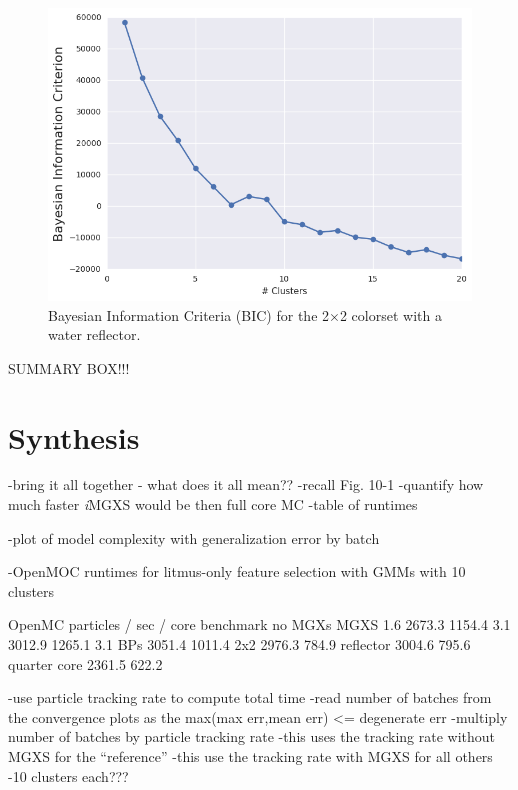 \begin{figure}[h!]
\centering
\includegraphics[width=0.87\linewidth]{figures/results/model-select/reflector/bic-combined-U238-nu-fission-1}
\vspace{2mm}
\caption[BIC for the 2$\times$2 colorset with reflector]{Bayesian Information Criteria (BIC) for the 2$\times$2 colorset with a water reflector.}
\label{fig:chap11-refl-bic}
\end{figure}

\clearpage

SUMMARY BOX!!!

\section{Synthesis}
\label{sec:chap11-synthesis}

-bring it all together - what does it all mean??
-recall Fig. 10-1
  -quantify how much faster \textit{i}\ac{MGXS} would be then full core MC
  -table of runtimes

-plot of model complexity with generalization error by batch

-OpenMOC runtimes for litmus-only feature selection with GMMs with 10 clusters

OpenMC particles / sec / core
benchmark         no MGXs        MGXS
1.6               2673.3         1154.4
3.1               3012.9         1265.1
3.1 BPs           3051.4         1011.4
2x2               2976.3          784.9
reflector         3004.6          795.6
quarter core      2361.5          622.2

-use particle tracking rate to compute total time
  -read number of batches from the convergence plots as the max(max err,mean err) <= degenerate err
  -multiply number of batches by particle tracking rate
  -this uses the tracking rate without MGXS for the ``reference''
  -this use the tracking rate with MGXS for all others
  -10 clusters each???

